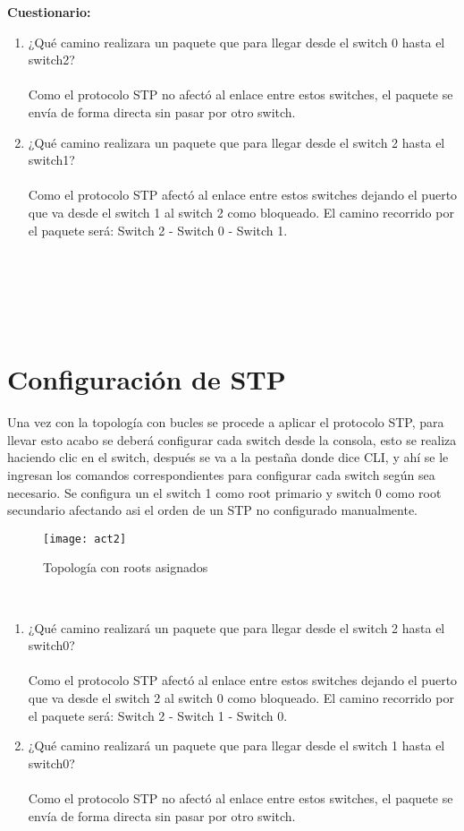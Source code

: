 \documentclass{udpreport}
\begin{document}
	{\large \bf{Cuestionario: }}\\
	\begin{enumerate}
	    \item ¿Qué camino realizara un paquete que para llegar desde el switch
                0 hasta el switch2?\\\\
                 Como el protocolo STP no afectó al enlace entre estos switches, el paquete se envía de forma directa sin pasar por otro switch.
    
        \item ¿Qué camino realizara un paquete que para llegar desde el switch
            2 hasta el switch1?\\\\
            Como el protocolo STP afectó al enlace entre estos switches dejando el puerto que va desde el switch 1 al switch 2 como bloqueado. El camino recorrido por el paquete será: Switch 2 - Switch 0 - Switch 1.\\\\\\\\\\\ 
	\end{enumerate}
	\section{Configuración de STP}
	Una vez con la topología con bucles se procede a aplicar el protocolo STP, para llevar esto acabo se deberá configurar cada
	switch desde la consola, esto se realiza haciendo clic en el switch, después se va a la pestaña donde dice CLI, y ahí se le
	ingresan los comandos correspondientes para configurar cada switch según sea necesario. Se configura un el switch 1 como root primario y switch 0 como root secundario afectando asi el orden de un STP no configurado manualmente.\\
	\begin{figure}[H]
	\centering
	\texttt{[image: act2]}
	\caption{Topología con roots asignados}
	\end{figure}\\
    \begin{enumerate}
	    \item ¿Qué camino realizará un paquete que para llegar desde el switch
2 hasta el switch0?\\\\
        Como el protocolo STP afectó al enlace entre estos switches dejando el puerto que va desde el switch 2 al switch 0 como bloqueado. El camino recorrido por el paquete será: Switch 2 - Switch 1 - Switch 0. 
        \item  ¿Qué camino realizará un paquete que para llegar desde el switch
1 hasta el switch0?\\\\
          Como el protocolo STP no afectó al enlace entre estos switches, el paquete se envía de forma directa sin pasar por otro switch.
          \vfill 
	\end{enumerate}
\end{document}
